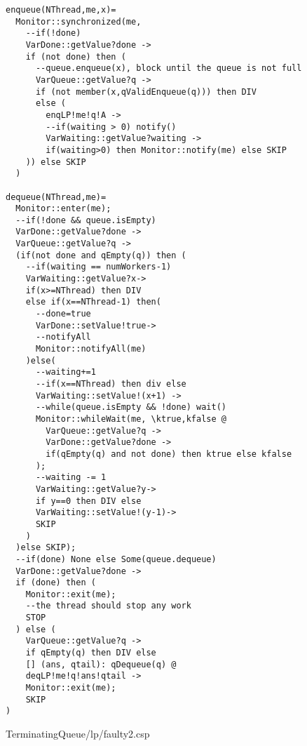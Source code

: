 \begin{lstlisting}
enqueue(NThread,me,x)=
  Monitor::synchronized(me,
    --if(!done)
    VarDone::getValue?done ->
    if (not done) then (
      --queue.enqueue(x), block until the queue is not full
      VarQueue::getValue?q ->
      if (not member(x,qValidEnqueue(q))) then DIV
      else (
        enqLP!me!q!A ->
        --if(waiting > 0) notify()
        VarWaiting::getValue?waiting ->
        if(waiting>0) then Monitor::notify(me) else SKIP
    )) else SKIP
  )
  
dequeue(NThread,me)=
  Monitor::enter(me);
  --if(!done && queue.isEmpty)
  VarDone::getValue?done ->
  VarQueue::getValue?q ->
  (if(not done and qEmpty(q)) then (
    --if(waiting == numWorkers-1)
    VarWaiting::getValue?x->
    if(x>=NThread) then DIV
    else if(x==NThread-1) then(
      --done=true
      VarDone::setValue!true->
      --notifyAll
      Monitor::notifyAll(me)
    )else(
      --waiting+=1
      --if(x==NThread) then div else
      VarWaiting::setValue!(x+1) ->
      --while(queue.isEmpty && !done) wait()
      Monitor::whileWait(me, \ktrue,kfalse @
        VarQueue::getValue?q ->
        VarDone::getValue?done ->
        if(qEmpty(q) and not done) then ktrue else kfalse
      );
      --waiting -= 1
      VarWaiting::getValue?y->
      if y==0 then DIV else 
      VarWaiting::setValue!(y-1)->
      SKIP
    )
  )else SKIP);
  --if(done) None else Some(queue.dequeue)
  VarDone::getValue?done ->
  if (done) then (
    Monitor::exit(me);
    --the thread should stop any work
    STOP
  ) else (
    VarQueue::getValue?q ->
    if qEmpty(q) then DIV else
    [] (ans, qtail): qDequeue(q) @
    deqLP!me!q!ans!qtail ->
    Monitor::exit(me);
    SKIP
)
\end{lstlisting}
TerminatingQueue/lp/faulty2.csp
